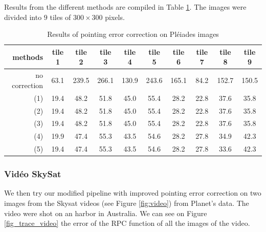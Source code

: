 \documentclass[paper=a4, fontsize=11pt, onecolumn, tikz, dvipsnames, svgnames, x11names]{article}
\begin{document}
 Results from the different methods are compiled in Table \ref{tab:testdata-res}. The images were divided into $9$ tiles of $300 \times 300$ pixels.

\begin{table}[h]
\centering
             \begin{tabular}{|r||c|c|c|c|c|c|c|c|c|}
              \hline
           methods &   tile 1 & tile 2 & tile 3 & tile 4 & tile 5 & tile 6 & tile 7 & tile 8 & tile 9\\
              \hline
          no correction &   63.1& 239.5& 266.1& 130.9& 243.6& 165.1& 84.2& 152.7& 150.5 \\
             \hline
      (1) &  19.4& 48.2& 51.8& 45.0& 55.4& 28.2& 22.8& 37.6& 35.8\\
       (2) & 19.4& 48.2& 51.8& 45.0& 55.4& 28.2& 22.8& 37.6& 35.8\\
       (3) & 19.4& 48.2& 51.8& 45.0& 55.4& 28.2& 22.8& 37.6& 35.8\\
      (4) & 19.9& 47.4& 55.3& 43.5& 54.6& 28.2& 27.8& 34.9& 42.3\\
      (5)  & 19.4& 47.4& 55.3& 43.5& 54.6& 28.2& 27.8& 33.6& 42.3\\
              \hline
            \end{tabular}
            \caption{Results of pointing error correction on Pléiades images}
             \label{tab:testdata-res}
          \end{table}


 \subsubsection{Vidéo SkySat}
             We then try our modified pipeline with improved pointing error correction on two images from the Skysat videos (see Figure \ref{fig:video}) from Planet's data. The video were shot on an harbor in Australia. We can see on Figure \ref{fig_trace_video} the error of the RPC function of all the images of the video.\\
\end{document}
